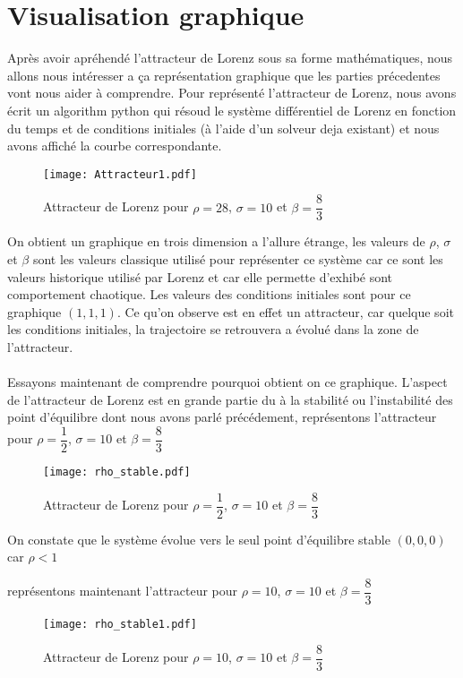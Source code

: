  \section{Visualisation graphique}
Après avoir apréhendé l'attracteur de Lorenz sous sa forme mathématiques, nous allons nous intéresser a ça représentation graphique que les parties précedentes vont nous aider à comprendre. Pour représenté l'attracteur de Lorenz, nous avons écrit un algorithm python qui résoud le système différentiel de Lorenz en fonction du temps et de conditions initiales (à l'aide d'un solveur deja existant) et nous avons affiché la courbe correspondante.\\

\begin{figure}
        \texttt{[image: Attracteur1.pdf]}
        \caption{Attracteur de Lorenz pour $\rho=28$, $\sigma=10$ et $\beta=\dfrac{8}{3}$} 
\end{figure} 

On obtient un graphique en trois dimension a l'allure étrange, les valeurs de $\rho$, $\sigma$ et $\beta$ sont les valeurs classique utilisé pour représenter ce système car ce sont les valeurs historique utilisé par Lorenz et car elle permette d'exhibé sont comportement chaotique. Les valeurs des conditions initiales sont pour ce graphique $(1,1,1)$. Ce qu'on observe est en effet un attracteur, car quelque soit les conditions initiales, la trajectoire se retrouvera a évolué dans la zone de l'attracteur.\\\\
Essayons maintenant de comprendre pourquoi obtient on ce graphique. L'aspect de l'attracteur de Lorenz est en grande partie du à la stabilité ou l'instabilité des point d'équilibre dont nous avons parlé précédement, représentons l'attracteur pour $\rho=\dfrac{1}{2}$, $\sigma=10$ et $\beta=\dfrac{8}{3}$  

\begin{figure}
    \texttt{[image: rho\_stable.pdf]}
    \caption{Attracteur de Lorenz pour $\rho=\dfrac{1}{2}$, $\sigma=10$ et $\beta=\dfrac{8}{3}$} 
\end{figure}
On constate que le système évolue vers le seul point d'équilibre stable $(0,0,0)$ car $\rho<1$

représentons maintenant l'attracteur pour $\rho=10$, $\sigma=10$ et $\beta=\dfrac{8}{3}$

\begin{figure}
    \texttt{[image: rho\_stable1.pdf]}
    \caption{Attracteur de Lorenz pour $\rho=10$, $\sigma=10$ et $\beta=\dfrac{8}{3}$} 
\end{figure}

